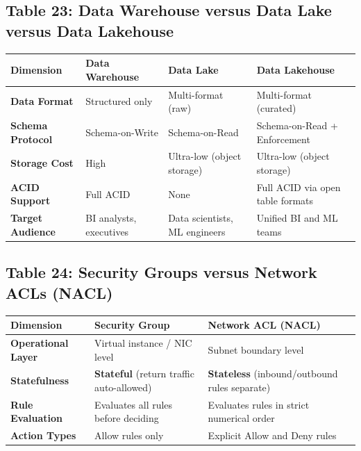 \subsection*{Table 23: Data Warehouse versus Data Lake versus Data Lakehouse}
\begin{center}
\small
\begin{tabularx}{\textwidth}{lXXX}
\toprule
\textbf{Dimension} & \textbf{Data Warehouse} & \textbf{Data Lake} & \textbf{Data Lakehouse} \\
\midrule
\textbf{Data Format} & Structured only & Multi-format (raw) & Multi-format (curated) \\
\textbf{Schema Protocol} & Schema-on-Write & Schema-on-Read & Schema-on-Read + Enforcement \\
\textbf{Storage Cost} & High & Ultra-low (object storage) & Ultra-low (object storage) \\
\textbf{ACID Support} & Full ACID & None & Full ACID via open table formats \\
\textbf{Target Audience} & BI analysts, executives & Data scientists, ML engineers & Unified BI and ML teams \\
\bottomrule
\end{tabularx}
\end{center}

\subsection*{Table 24: Security Groups versus Network ACLs (NACL)}
\begin{center}
\small
\begin{tabularx}{\textwidth}{lXX}
\toprule
\textbf{Dimension} & \textbf{Security Group} & \textbf{Network ACL (NACL)} \\
\midrule
\textbf{Operational Layer} & Virtual instance / NIC level & Subnet boundary level \\
\textbf{Statefulness} & \textbf{Stateful} (return traffic auto-allowed) & \textbf{Stateless} (inbound/outbound rules separate) \\
\textbf{Rule Evaluation} & Evaluates all rules before deciding & Evaluates rules in strict numerical order \\
\textbf{Action Types} & Allow rules only & Explicit Allow and Deny rules \\
\bottomrule
\end{tabularx}
\end{center}

